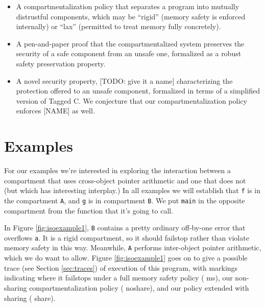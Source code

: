 \documentclass{article}
\begin{document}
\begin{itemize}
\item A compartmentalization policy that separates a program into mutually distrustful
  components, which may be ``rigid'' (memory safety is enforced internally) or ``lax''
  (permitted to treat memory fully concretely).
\item A pen-and-paper proof that the compartmentalized system preserves the security of a
  safe component from an unsafe one, formalized as a robust safety preservation property.
\item A novel security property, [TODO: give it a name] characterizing the protection offered
  to an unsafe component, formalized in terms of a simplified version of Tagged C. We conjecture
  that our compartmentalization policy enforces [NAME] as well.
\end{itemize}

\section{Examples}

For our examples we're interested in exploring the interaction between a compartment that uses
cross-object pointer arithmetic and one that does not (but which has interesting interplay.)
In all examples we will establish that {\tt f} is in the compartment {\tt A}, and {\tt g} is in
compartment {\tt B}. We put {\tt main} in the opposite compartment from the function
that it's going to call.

In Figure \ref{fig:isoexample1}, {\tt B} contains a pretty ordinary off-by-one error
that overflows {\tt a}. It is a rigid compartment, so it should failstop rather than
violate memory safety in this way. Meanwhile, {\tt A} performs inter-object pointer
arithmetic, which we do want to allow. Figure \ref{fig:isoexample1} goes on to give a possible
trace (see Section \ref{sec:traces}) of execution of this program, with markings indicating
where it failstops under a full memory safety policy ({\color{red} \sc ms}), our non-sharing
compartmentalization policy ({\color{red} \sc noshare}), and our policy extended with
sharing ({\color{red} \sc share}).

\end{document}

